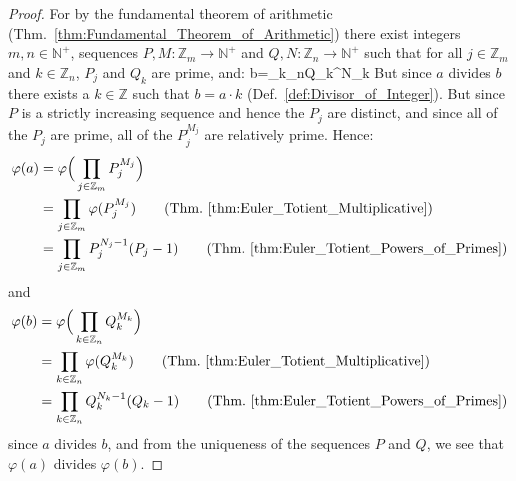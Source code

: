 \documentclass{article}                                                        %
\begin{document}
            \begin{proof}
                For by the fundamental theorem of arithmetic
                (Thm.~\ref{thm:Fundamental_Theorem_of_Arithmetic}) there exist
                integers $m,n\in\mathbb{N}^{+}$, sequences
                $P,M:\mathbb{Z}_{m}\rightarrow\mathbb{N}^{+}$ and
                $Q,N:\mathbb{Z}_{n}\rightarrow\mathbb{N}^{+}$ such that for all
                $j\in\mathbb{Z}_{m}$ and $k\in\mathbb{Z}_{n}$, $P_{j}$ and
                $Q_{k}$ are prime, and:
                            {b=\prod_{k\in{}_{n}}Q_{k}^{N_{k}}}
                But since $a$ divides $b$ there exists a $k\in\mathbb{Z}$ such
                that $b=a\cdot{k}$ (Def.~\ref{def:Divisor_of_Integer}). But
                since $P$ is a strictly increasing sequence and hence the
                $P_{j}$ are distinct, and since all of the $P_{j}$ are prime,
                all of the $P_{j}^{M_{j}}$ are relatively prime. Hence:
                \begin{align*}
                    \varphi(a)&=\varphi\Big(
                        \prod_{j\in\mathbb{Z}_{m}}P_{j}^{M_{j}}
                    \Big)\\
                    &=\prod_{j\in\mathbb{Z}_{m}}\varphi(P_{j}^{M_{j}})
                        \tag{Thm.~\ref{thm:Euler_Totient_Multiplicative}}\\
                    &=\prod_{j\in\mathbb{Z}_{m}}P_{j}^{N_{j}-1}(P_{j}-1)
                        \tag{Thm.~\ref{thm:Euler_Totient_Powers_of_Primes}}
                \end{align*}
                and
                \begin{align*}
                    \varphi(b)&=\varphi\Big(
                        \prod_{k\in\mathbb{Z}_{n}}Q_{k}^{M_{k}}
                    \Big)\\
                    &=\prod_{k\in\mathbb{Z}_{n}}\varphi(Q_{k}^{M_{k}})
                        \tag{Thm.~\ref{thm:Euler_Totient_Multiplicative}}\\
                    &=\prod_{k\in\mathbb{Z}_{n}}Q_{k}^{N_{k}-1}(Q_{k}-1)
                        \tag{Thm.~\ref{thm:Euler_Totient_Powers_of_Primes}}
                \end{align*}
                since $a$ divides $b$, and from the uniqueness of the sequences
                $P$ and $Q$, we see that $\varphi(a)$ divides $\varphi(b)$.
            \end{proof}
\end{document}
